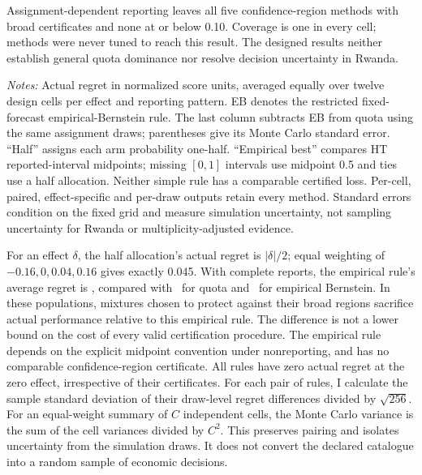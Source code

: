 \documentclass[11pt]{article}
\begin{document}
Assignment-dependent reporting leaves all five confidence-region methods with broad certificates and none at or below 0.10. Coverage is one in every cell; methods were never tuned to reach this result. The designed results neither establish general quota dominance nor resolve decision uncertainty in Rwanda.

\begin{table}[htbp]
\centering\small\caption{Effect-specific regret and simple decision benchmarks}\label{tab:decisioneffects}
\resizebox{\textwidth}{!}{}
\begin{minipage}{\textwidth}\footnotesize\emph{Notes:} Actual regret in normalized score units, averaged equally over twelve design cells per effect and reporting pattern. EB denotes the restricted fixed-forecast empirical-Bernstein rule. The last column subtracts EB from quota using the same assignment draws; parentheses give its Monte Carlo standard error. ``Half'' assigns each arm probability one-half. ``Empirical best'' compares HT reported-interval midpoints; missing $[0,1]$ intervals use midpoint 0.5 and ties use a half allocation. Neither simple rule has a comparable certified loss. Per-cell, paired, effect-specific and per-draw outputs retain every method. Standard errors condition on the fixed grid and measure simulation uncertainty, not sampling uncertainty for Rwanda or multiplicity-adjusted evidence.\end{minipage}
\end{table}

For an effect $\delta$, the half allocation's actual regret is $|\delta|/2$; equal weighting of $-0.16,0,0.04,0.16$ gives exactly 0.045. With complete reports, the empirical rule's average regret is \BenchmarkEmpiricalCompleteRegret, compared with \BenchmarkQuotaCompleteRegret\ for quota and \BenchmarkEBCompleteRegret\ for empirical Bernstein. In these populations, mixtures chosen to protect against their broad regions sacrifice actual performance relative to this empirical rule. The difference is not a lower bound on the cost of every valid certification procedure. The empirical rule depends on the explicit midpoint convention under nonreporting, and has no comparable confidence-region certificate. All rules have zero actual regret at the zero effect, irrespective of their certificates. For each pair of rules, I calculate the sample standard deviation of their draw-level regret differences divided by $\sqrt{256}$. For an equal-weight summary of $C$ independent cells, the Monte Carlo variance is the sum of the cell variances divided by $C^2$. This preserves pairing and isolates uncertainty from the simulation draws. It does not convert the declared catalogue into a random sample of economic decisions.
\end{document}
